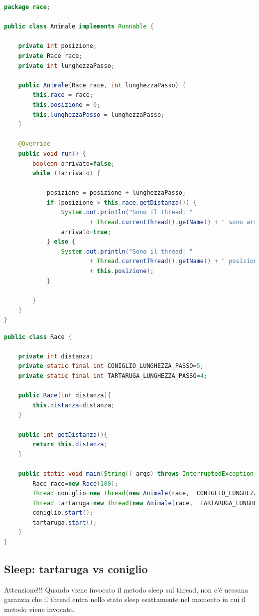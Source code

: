 \documentclass{article}
\begin{document}
\begin{lstlisting}[language=Java]
package race;

public class Animale implements Runnable {

	private int posizione;
	private Race race;
	private int lunghezzaPasso;

	public Animale(Race race, int lunghezzaPasso) {
		this.race = race;
		this.posizione = 0;
		this.lunghezzaPasso = lunghezzaPasso;
	}

	@Override
	public void run() {
		boolean arrivato=false;
		while (!arrivato) {

			posizione = posizione + lunghezzaPasso;
			if (posizione > this.race.getDistanza()) {
				System.out.println("Sono il thread: "
						+ Thread.currentThread().getName() + " sono arrivato");
				arrivato=true;
			} else {
				System.out.println("Sono il thread: "
						+ Thread.currentThread().getName() + " posizione "
						+ this.posizione);
			}

		}
	}
}
\end{lstlisting}

\begin{lstlisting}[language=Java]
public class Race {
	
	private int distanza;
	private static final int CONIGLIO_LUNGHEZZA_PASSO=5;
	private static final int TARTARUGA_LUNGHEZZA_PASSO=4;
	
	public Race(int distanza){
		this.distanza=distanza;
	}
	
	public int getDistanza(){
		return this.distanza;
	}
	
	public static void main(String[] args) throws InterruptedException {
		Race race=new Race(100);
		Thread coniglio=new Thread(new Animale(race,  CONIGLIO_LUNGHEZZA_PASSO), "CONIGLIO");
		Thread tartaruga=new Thread(new Animale(race,  TARTARUGA_LUNGHEZZA_PASSO), "TARTARUGA");
		coniglio.start();
		tartaruga.start();
	}
}
\end{lstlisting}


\subsection{Sleep: tartaruga vs coniglio}
Attenzione!!! Quando viene invocato il metodo sleep sul thread, non c'\`e nessuna garanzia che il thread entra nello stato sleep esattamente nel momento in cui il metodo viene invocato.
\end{document}
